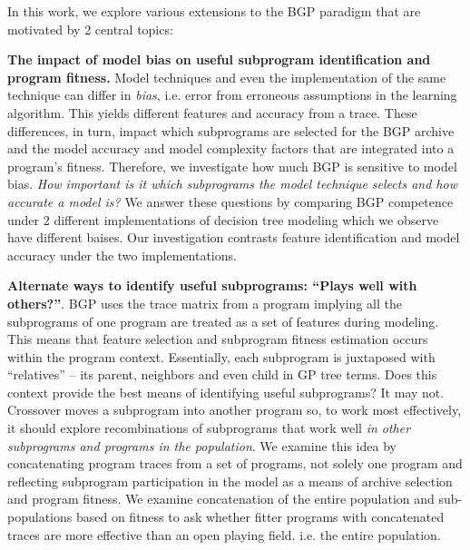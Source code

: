 In this work,  we explore various extensions to the BGP paradigm that are motivated by 2 central topics: \begin{inparaenum}

\item \textbf{The impact of model bias on useful subprogram identification and program fitness.}  Model techniques and even the implementation of the same technique can differ in  \textit{bias}, i.e. error from erroneous assumptions in the learning algorithm. This yields different features and accuracy from a trace. These differences, in turn, impact which subprograms are selected for the BGP archive and the model accuracy and model complexity factors that are integrated into a program's fitness. Therefore, we investigate how much BGP is sensitive to model bias. %
\textit{How important is it which subprograms the model technique selects and how accurate a model is? }  We answer these questions by comparing BGP competence under 2 different implementations of decision tree modeling which we observe have different baises. Our investigation contrasts feature identification and model accuracy under the two implementations. 

\item \textbf{Alternate ways to identify useful subprograms: \textbf{``Plays well with others?''}}. BGP uses the trace matrix from a program implying all the subprograms of one program are treated as a set of features during modeling. This means that feature selection and subprogram fitness estimation occurs within the program context.  Essentially, each subprogram is juxtaposed with ``relatives'' -- its parent, neighbors and even child in GP tree terms. Does this context provide the best means of identifying useful subprograms? It may not. Crossover moves a subprogram into another program so, to work most effectively, it should explore recombinations of subprograms that work well \textit{in other subprograms and programs in the population}. We examine this idea by concatenating program traces from a set of programs, not solely one program and reflecting subprogram participation in the model as a means of archive selection and program fitness. We examine concatenation of the entire population and sub-populations based on fitness to ask whether fitter programs with concatenated traces are more effective than an open playing field. i.e. the entire population.  

\end{inparaenum}


